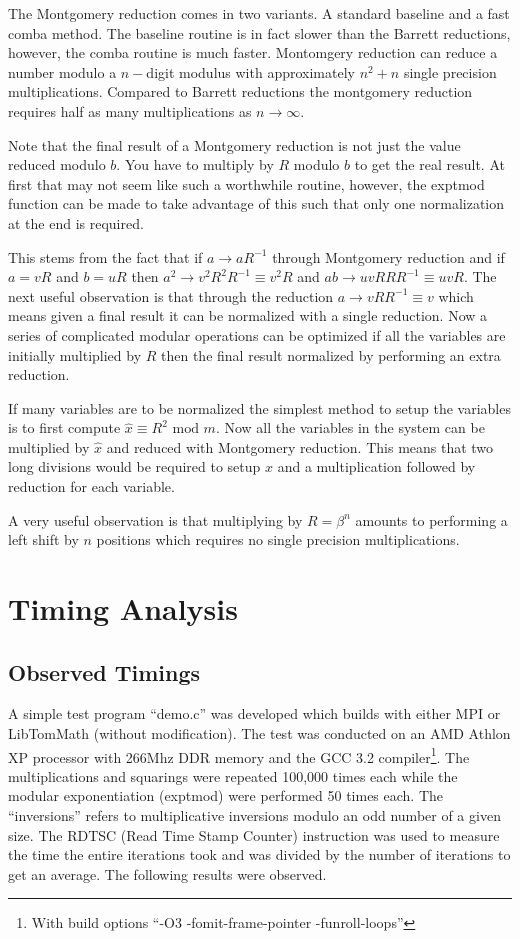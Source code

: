 \documentclass{article}
\begin{document}
The Montgomery reduction comes in two variants.  A standard baseline and a fast comba method.  The baseline routine
is in fact slower than the Barrett reductions, however, the comba routine is much faster.  Montomgery reduction can 
reduce a number modulo a $n-$digit modulus with approximately $n^2 + n$ single precision multiplications.  Compared
to Barrett reductions the montgomery reduction requires half as many multiplications as $n \rightarrow \infty$.  

Note that the final result of a Montgomery reduction is not just the value reduced modulo $b$.  You have to multiply
by $R$ modulo $b$ to get the real result.  At first that may not seem like such a worthwhile routine, however, the
exptmod function can be made to take advantage of this such that only one normalization at the end is required.

This stems from the fact that if $a \rightarrow aR^{-1}$ through Montgomery reduction and if $a = vR$ and $b = uR$ then
$a^2 \rightarrow v^2R^2R^{-1} \equiv v^2R$ and $ab \rightarrow uvRRR^{-1} \equiv uvR$.  The next useful observation is 
that through the reduction $a \rightarrow vRR^{-1} \equiv v$ which means given a final result it can be normalized with
a single reduction.  Now a series of complicated modular operations can be optimized if all the variables are initially
multiplied by $R$ then the final result normalized by performing an extra reduction.

If many variables are to be normalized the simplest method to setup the variables is to first compute $\hat x \equiv R^2 \mbox{ mod }m$.
Now all the variables in the system can be multiplied by $\hat x$ and reduced with Montgomery reduction.  This means that
two long divisions would be required to setup $\hat x$ and a multiplication followed by reduction for each variable.  

A very useful observation is that multiplying by $R = \beta^n$ amounts to performing a left shift by $n$ positions which
requires no single precision multiplications.  

\section{Timing Analysis}
\subsection{Observed Timings}
A simple test program ``demo.c'' was developed which builds with either MPI or LibTomMath (without modification).  The
test was conducted on an AMD Athlon XP processor with 266Mhz DDR memory and the GCC 3.2 compiler\footnote{With build
options ``-O3 -fomit-frame-pointer -funroll-loops''}.    The multiplications and squarings were repeated 100,000 times 
each while the modular exponentiation (exptmod) were performed 50 times each.  The ``inversions'' refers to multiplicative
inversions modulo an odd number of a given size.  The RDTSC (Read Time Stamp Counter) instruction was used to measure the 
time the entire iterations took and was divided by the number of iterations to get an average.  The following results 
were observed.
\end{document}
